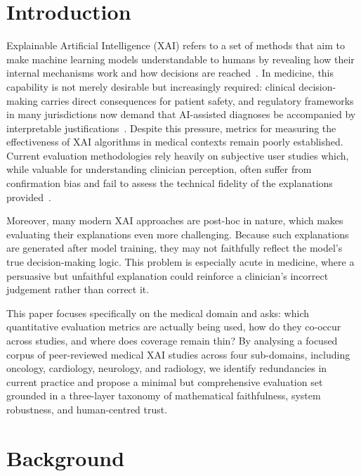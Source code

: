 \newpage
\section{Introduction}

Explainable Artificial Intelligence (XAI) refers to a set of methods that aim
to make machine learning models understandable to humans by revealing how their
internal mechanisms work and how decisions are reached~\cite{Arrieta2020XAI}. In medicine, this
capability is not merely desirable but increasingly required: clinical
decision-making carries direct consequences for patient safety, and regulatory
frameworks in many jurisdictions now demand that AI-assisted diagnoses be
accompanied by interpretable justifications~\cite{jin2023guidelines}. Despite
this pressure, metrics for measuring the effectiveness of XAI algorithms in
medical contexts remain poorly established. Current evaluation methodologies
rely heavily on subjective user studies which, while valuable for understanding
clinician perception, often suffer from confirmation bias and fail to assess the
technical fidelity of the explanations provided~\cite{mirzaei2023xai}.

Moreover, many modern XAI approaches are post-hoc in nature, which makes
evaluating their explanations even more challenging. Because such explanations
are generated after model training, they may not faithfully reflect the model's
true decision-making logic. This problem is especially acute in medicine, where
a persuasive but unfaithful explanation could reinforce a clinician's incorrect
judgement rather than correct it.

This paper focuses specifically on the medical domain and asks: which
quantitative evaluation metrics are actually being used, how do they
co-occur across studies, and where does coverage remain thin? By analysing a
focused corpus of peer-reviewed medical XAI studies across four sub-domains, including
oncology, cardiology, neurology, and radiology, we identify redundancies in
current practice and propose a minimal but comprehensive evaluation set grounded
in a three-layer taxonomy of mathematical faithfulness, system robustness, and
human-centred trust.


\section{Background}

